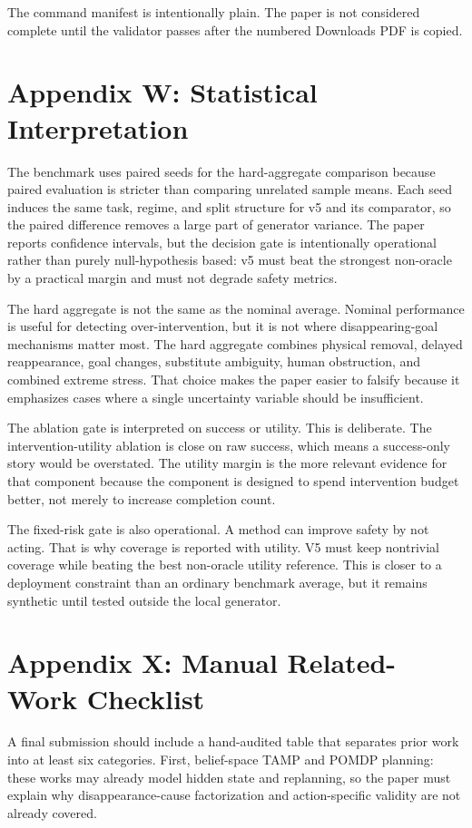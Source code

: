 \documentclass{article}
\begin{document}
The command manifest is intentionally plain. The paper is not considered complete until the validator passes after the numbered Downloads PDF is copied.

\section{Appendix W: Statistical Interpretation}
The benchmark uses paired seeds for the hard-aggregate comparison because paired evaluation is stricter than comparing unrelated sample means. Each seed induces the same task, regime, and split structure for v5 and its comparator, so the paired difference removes a large part of generator variance. The paper reports confidence intervals, but the decision gate is intentionally operational rather than purely null-hypothesis based: v5 must beat the strongest non-oracle by a practical margin and must not degrade safety metrics.

The hard aggregate is not the same as the nominal average. Nominal performance is useful for detecting over-intervention, but it is not where disappearing-goal mechanisms matter most. The hard aggregate combines physical removal, delayed reappearance, goal changes, substitute ambiguity, human obstruction, and combined extreme stress. That choice makes the paper easier to falsify because it emphasizes cases where a single uncertainty variable should be insufficient.

The ablation gate is interpreted on success or utility. This is deliberate. The intervention-utility ablation is close on raw success, which means a success-only story would be overstated. The utility margin is the more relevant evidence for that component because the component is designed to spend intervention budget better, not merely to increase completion count.

The fixed-risk gate is also operational. A method can improve safety by not acting. That is why coverage is reported with utility. V5 must keep nontrivial coverage while beating the best non-oracle utility reference. This is closer to a deployment constraint than an ordinary benchmark average, but it remains synthetic until tested outside the local generator.

\section{Appendix X: Manual Related-Work Checklist}
A final submission should include a hand-audited table that separates prior work into at least six categories. First, belief-space TAMP and POMDP planning: these works may already model hidden state and replanning, so the paper must explain why disappearance-cause factorization and action-specific validity are not already covered.
\end{document}

